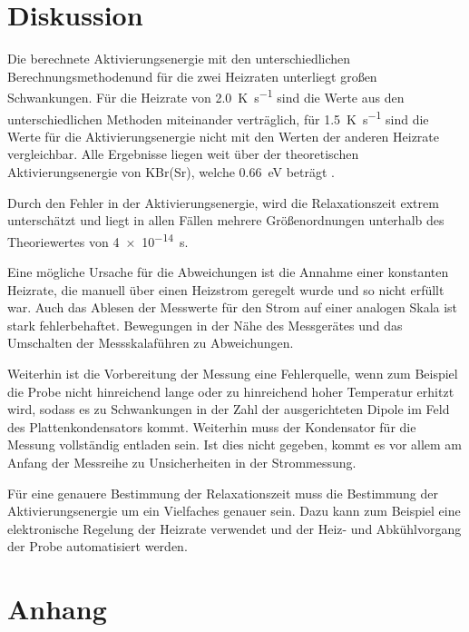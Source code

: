 \section{Diskussion}

Die berechnete Aktivierungsenergie mit den unterschiedlichen Berechnungsmethodenund für die zwei Heizraten unterliegt großen Schwankungen. Für die Heizrate von \SI{2.0}{\kelvin\per\second} sind die Werte aus den unterschiedlichen Methoden miteinander verträglich, für \SI{1.5}{\kelvin\per\second} sind die Werte für die Aktivierungsenergie nicht mit den Werten der anderen Heizrate vergleichbar. Alle Ergebnisse liegen weit über der theoretischen Aktivierungsenergie von KBr(Sr), welche \SI{0.66}{\electronvolt} beträgt \cite{KBr-Sr}.\par
Durch den Fehler in der Aktivierungsenergie, wird die Relaxationszeit extrem unterschätzt und liegt in allen Fällen mehrere Größenordnungen unterhalb des Theoriewertes von \SI{4e-14}{\second}.\par
Eine mögliche Ursache für die Abweichungen ist die Annahme einer konstanten Heizrate, die manuell über einen Heizstrom geregelt wurde und so nicht erfüllt war. Auch das Ablesen der Messwerte für den Strom auf einer analogen Skala ist stark fehlerbehaftet. Bewegungen in der Nähe des Messgerätes und das Umschalten der Messskalaführen zu Abweichungen.\par
Weiterhin ist die Vorbereitung der Messung eine Fehlerquelle, wenn zum Beispiel die Probe nicht hinreichend lange oder zu hinreichend hoher Temperatur erhitzt wird, sodass es zu Schwankungen in der Zahl der ausgerichteten Dipole im Feld des Plattenkondensators kommt. Weiterhin muss der Kondensator für die Messung vollständig entladen sein. Ist dies nicht gegeben, kommt es vor allem am Anfang der Messreihe zu Unsicherheiten in der Strommessung.\par
Für eine genauere Bestimmung der Relaxationszeit muss die Bestimmung der Aktivierungsenergie um ein Vielfaches genauer sein. Dazu kann zum Beispiel eine elektronische Regelung der Heizrate verwendet und der Heiz- und Abkühlvorgang der Probe automatisiert werden.

\printbibliography

\section{Anhang}



